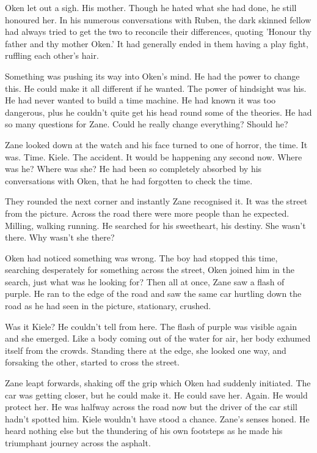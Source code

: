Oken let out a sigh.  His mother.  Though he hated what she had done, he still honoured her.  In his numerous conversations with Ruben, the dark skinned fellow had always tried to get the two to reconcile their differences, quoting 'Honour thy father and thy mother Oken.'  It had generally ended in them having a play fight, ruffling each other's hair.

Something was pushing its way into Oken's mind.  He had the power to change this.  He could make it all different if he wanted.  The power of hindsight was his.  He had never wanted to build a time machine.  He had known it was too dangerous, plus he couldn't quite get his head round some of the theories.  He had so many questions for Zane.  Could he really change everything?  Should he?

Zane looked down at the watch and his face turned to one of horror, the time.  It was.  Time.  Kiele.  The accident.  It would be happening any second now.  Where was he?  Where was she?  He had been so completely absorbed by his conversations with Oken, that he had forgotten to check the time.  

They rounded the next corner and instantly Zane recognised it.  It was the street from the picture.  Across the road there were more people than he expected.  Milling, walking running.  He searched for his sweetheart, his destiny.  She wasn't there.  Why wasn't she there?

Oken had noticed something was wrong.  The boy had stopped this time, searching desperately for something across the street, Oken joined him in the search, just what was he looking for?  Then all at once, Zane saw a flash of purple.  He ran to the edge of the road and saw the same car hurtling down the road as he had seen in the picture, stationary, crushed.

Was it Kiele?  He couldn't tell from here.  The flash of purple was visible again and she emerged.  Like a body coming out of the water for air, her body exhumed itself from the crowds.  Standing there at the edge, she looked one way, and forsaking the other, started to cross the street.

Zane leapt forwards, shaking off the grip which Oken had suddenly initiated.  The car was getting closer, but he could make it.  He could save her.  Again.  He would protect her.  He was halfway across the road now but the driver of the car still hadn't spotted him.  Kiele wouldn't have stood a chance.  Zane's senses honed.  He heard nothing else but the thundering of his own footsteps as he made his triumphant journey across the asphalt.  

